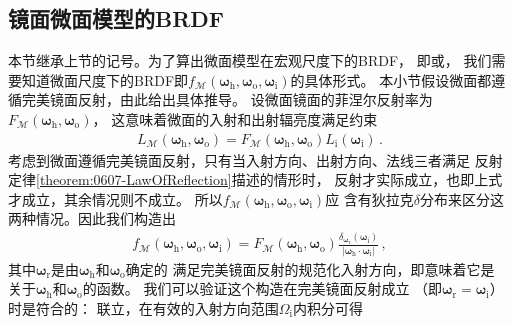 \subsection{镜面微面模型的BRDF}\label{sub:镜面微面模型的BRDF}
本节继承上节的记号。为了算出微面模型在宏观尺度下的BRDF，
即或，
我们需要知道微面尺度下的BRDF即$f_{\mathcal{M}}({\bm\omega}_{\mathrm{h}},{\bm\omega}_{\mathrm{o}},{\bm\omega}_{\mathrm{i}})$的具体形式。
本小节假设微面都遵循完美镜面反射，由此给出具体推导。
设微面镜面的菲涅尔反射率为$F_{\mathcal{M}}({\bm\omega}_{\mathrm{h}},{\bm\omega}_{\mathrm{o}})$，
这意味着微面的入射和出射辐亮度满足约束
\begin{align}\label{eq:08ex01-FresnelMicrofacet}
    L_{\mathcal{M}}({\bm\omega}_{\mathrm{h}},{\bm\omega}_{\mathrm{o}})=F_{\mathcal{M}}({\bm\omega}_{\mathrm{h}},{\bm\omega}_{\mathrm{o}})L_{\mathrm{i}}({\bm\omega}_{\mathrm{i}})\, .
\end{align}
考虑到微面遵循完美镜面反射，只有当入射方向、出射方向、法线三者满足
反射定律\ref{theorem:0607-LawOfReflection}描述的情形时，
反射才实际成立，也即上式才成立，其余情况则不成立。
所以$f_{\mathcal{M}}({\bm\omega}_{\mathrm{h}},{\bm\omega}_{\mathrm{o}},{\bm\omega}_{\mathrm{i}})$应
含有狄拉克$\delta$分布来区分这两种情况。因此我们构造出
\begin{align}\label{eq:08ex01-FresnelBRDFMicrofacet}
    f_{\mathcal{M}}({\bm\omega}_{\mathrm{h}},{\bm\omega}_{\mathrm{o}},{\bm\omega}_{\mathrm{i}})
    =F_{\mathcal{M}}({\bm\omega}_{\mathrm{h}},{\bm\omega}_{\mathrm{o}})\frac{\delta_{{\bm\omega}_{\mathrm{r}}}({\bm\omega}_{\mathrm{i}})}{|{\bm\omega}_{\mathrm{h}}\cdot{\bm\omega}_{\mathrm{i}}|}\, ,
\end{align}
其中${\bm\omega}_{\mathrm{r}}$是由${\bm\omega}_{\mathrm{h}}$和${\bm\omega}_{\mathrm{o}}$确定的
满足完美镜面反射的规范化入射方向，即意味着它是
关于${\bm\omega}_{\mathrm{h}}$和${\bm\omega}_{\mathrm{o}}$的函数。
我们可以验证这个构造在完美镜面反射成立
（即${\bm\omega}_{\mathrm{r}}={\bm\omega}_{\mathrm{i}}$）时是符合的：
联立，在有效的入射方向范围${\varOmega}_{\mathrm{i}}$内积分可得
